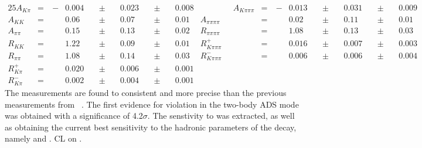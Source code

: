 \begin{alignat*}{25}
A_{K\pi} &= &\ -&0.004&\ &\pm&\ &0.023&\ &\pm&\ &0.008& \qquad\qquad
A_{K\pi\pi\pi} &= &\ -&0.013&\ &\pm&\ &0.031&\ &\pm&\ &0.009& \\
A_{KK} &= &&0.06&\ &\pm&\ &0.07&\ &\pm&\ &0.01& 
A_{\pi\pi\pi\pi} &= &&0.02&\ &\pm&\ &0.11&\ &\pm&\ &0.01& \\
A_{\pi\pi} &= &&0.15&\ &\pm&\ &0.13&\ &\pm&\ &0.02& 
R_{\pi\pi\pi\pi} &= &&1.08&\ &\pm&\ &0.13&\ &\pm&\ &0.03& \\
R_{KK} &= &&1.22&\ &\pm&\ &0.09&\ &\pm&\ &0.01& 
R^+_{K\pi\pi\pi} &= &&0.016&\ &\pm&\ &0.007&\ &\pm&\ &0.003& \\
R_{\pi\pi} &= &&1.08&\ &\pm&\ &0.14&\ &\pm&\ &0.03& 
R^-_{K\pi\pi\pi} &= &&0.006&\ &\pm&\ &0.006&\ &\pm&\ &0.004& \\
R^+_{K\pi} &= &&0.020&\ &\pm&\ &0.006&\ &\pm&\ &0.001& &&&&&&&&&&&&\\ 
R^-_{K\pi} &= &&0.002&\ &\pm&\ &0.004&\ &\pm&\ &0.001& &&&&&&&&&&&&
\end{alignat*} 
The measurements are found to consistent and more precise than the previous measurements from \babar~\cite{BaBarDKstar}. The first evidence for \CP violation in the two-body ADS mode was obtained with a significance of 4.2$\sigma$. The senstivity to \Pgamma was extracted, as well as obtaining the current best sensitivity to the hadronic parameters of the \Bm decay, namely \rb and \deltab. CL on \Pgamma.

